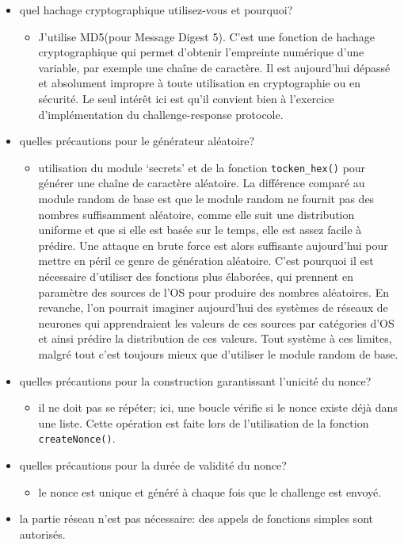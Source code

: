 \documentclass[
  french,
  paper=a4,
  ,captions=tableheading
]{scrartcl}
\providecommand{\tightlist}{%
  \setlength{\itemsep}{0pt}\setlength{\parskip}{0pt}}
\begin{document}
\begin{itemize}
\tightlist
\item
  quel hachage cryptographique utilisez-vous et pourquoi?

  \begin{itemize}
  \tightlist
  \item
    J'utilise MD5(pour Message Digest 5). C'est une fonction de hachage
    cryptographique qui permet d'obtenir l'empreinte numérique d'une
    variable, par exemple une chaîne de caractère. Il est aujourd'hui
    dépassé et absolument impropre à toute utilisation en cryptographie
    ou en sécurité. Le seul intérêt ici est qu'il convient bien à
    l'exercice d'implémentation du challenge-response protocole.
  \end{itemize}
\item
  quelles précautions pour le générateur aléatoire?

  \begin{itemize}
  \tightlist
  \item
    utilisation du module `secrets' et de la fonction
    \texttt{tocken\_hex()} pour générer une chaîne de caractère
    aléatoire. La différence comparé au module random de base est que le module random ne fournit pas des nombres suffisamment aléatoire, comme elle suit une distribution uniforme et que si elle est basée sur le temps, elle est assez facile à prédire.  Une attaque en brute force est alors suffisante aujourd'hui pour mettre en péril ce genre de génération aléatoire. C'est pourquoi il est nécessaire d'utiliser des fonctions plus élaborées, qui prennent en paramètre des sources de l'OS pour produire des nombres aléatoires. En revanche, l'on pourrait imaginer aujourd'hui des systèmes de réseaux de neurones qui apprendraient les valeurs de ces sources par catégories d'OS et ainsi prédire la distribution de ces valeurs. Tout système à ces limites, malgré tout c'est toujours mieux que d'utiliser le module random de base.
  \end{itemize}
\item
  quelles précautions pour la construction garantissant l'unicité du
  nonce?

  \begin{itemize}
  \tightlist
  \item
    il ne doit pas se répéter; ici, une boucle vérifie si le nonce
    existe déjà dans une liste. Cette opération est faite lors de
    l'utilisation de la fonction \texttt{createNonce()}.
  \end{itemize}
\item
  quelles précautions pour la durée de validité du nonce?

  \begin{itemize}
  \tightlist
  \item
    le nonce est unique et généré à chaque fois que le challenge est
    envoyé.
  \end{itemize}
\item
  la partie réseau n'est pas nécessaire: des appels de fonctions simples
  sont autorisés.
\end{itemize}
\end{document}
